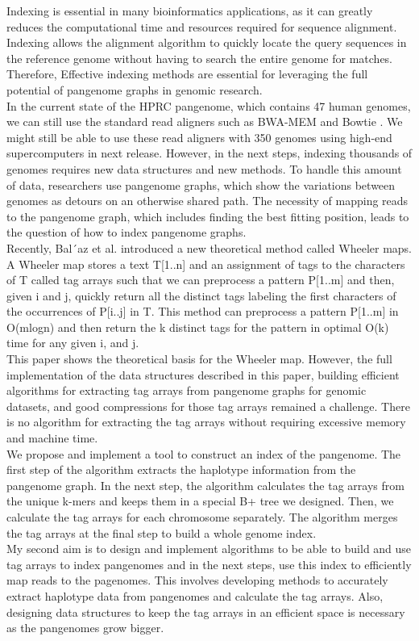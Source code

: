 \documentclass[11pt]{ucthesis}
\begin{document}
Indexing is essential in many bioinformatics applications, as it can greatly reduces the computational time and resources required for sequence alignment. Indexing allows the alignment algorithm to quickly locate the query sequences in the reference genome without having to search the entire genome for matches. Therefore, Effective indexing methods are essential for leveraging the full potential of pangenome graphs in genomic research. \\
In the current state of the HPRC pangenome, which contains 47 human genomes, we can still use the standard read aligners such as BWA-MEM \cite{li2013aligning} and Bowtie \cite{langmead2009ultrafast}. We might still be able to use these read aligners with 350 genomes using high-end supercomputers in next release. However, in the next steps, indexing thousands of genomes requires new data structures and new methods. To handle this amount of data, researchers use pangenome graphs, which show the variations between genomes as detours on an otherwise shared path. The necessity of mapping reads to the pangenome graph, which includes finding the best fitting position, leads to the question of how to index pangenome graphs.\\ 
Recently, Bal´az et al. \cite{balavz2024wheeler} introduced a new theoretical method called Wheeler maps. A Wheeler map stores a text T[1..n] and an assignment of tags to the characters of T called tag arrays such that we can preprocess a pattern P[1..m] and then, given i and j, quickly return all the distinct tags labeling the first characters of the occurrences of P[i..j] in T. This method can preprocess a pattern P[1..m] in O(mlogn) and then return the k distinct tags for the pattern in optimal O(k) time for any given i, and j. \\
This paper shows the theoretical basis for the Wheeler map. However, the full implementation of the data structures described in this paper, building efficient algorithms for extracting tag arrays from pangenome graphs for genomic datasets, and good compressions for those tag arrays remained a challenge. There is no algorithm for extracting the tag arrays without requiring excessive memory and machine time. \\
We propose and implement a tool to construct an index of the pangenome. The first step of the algorithm extracts the haplotype information from the pangenome graph. In the next step, the algorithm calculates the tag arrays from the unique k-mers and keeps them in a special B+ tree we designed. Then, we calculate the tag arrays for each chromosome separately. The algorithm merges the tag arrays at the final step to build a whole genome index.  \\
My second aim is to design and implement algorithms to be able to build and use tag arrays to index pangenomes and in the next steps, use this index to efficiently map reads to the pagenomes. This involves developing methods to accurately extract haplotype data from pangenomes and calculate the tag arrays. Also, designing data structures to keep the tag arrays in an efficient space is necessary as the pangenomes grow bigger. 
\end{document}
